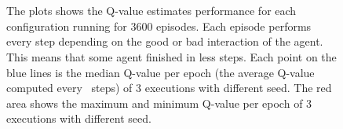 \begin{figure}[]
	\centering
	 \quad
	 \\
	 \quad
	 \\
	
	\caption{The plots shows the Q-value estimates performance for each configuration running for 3600 episodes. Each episode performs every step depending on the good or bad interaction of the agent. This means that some agent finished in less steps. Each point on the blue lines is the median Q-value per epoch (the average Q-value computed every \numepoch~steps) of 3 executions with different seed. The red area shows the maximum and minimum Q-value per epoch of 3 executions with different seed.}
	\label{fig:q-values}
\end{figure}


